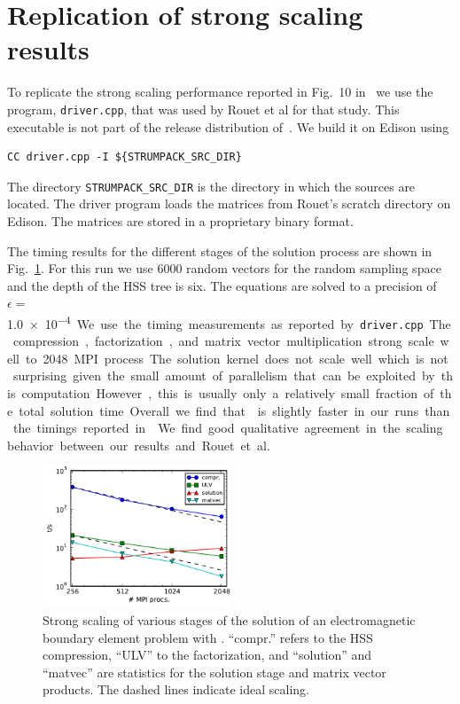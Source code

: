 \documentclass{acmsmall}
\begin{document}
\section{Replication of strong scaling results}

To replicate the strong scaling performance reported in Fig.~10
in~\cite{rouet:strumpack} we use the program, \verb!driver.cpp!,
that was used by Rouet et al for that study.  This executable is
not part of the release distribution of~\cite{rouet:strumpack}.
We build it on Edison using
\begin{verbatim}
CC driver.cpp -I ${STRUMPACK_SRC_DIR}
\end{verbatim}
The directory \verb!STRUMPACK_SRC_DIR! is the directory in which
the \strumpack{} sources are located.  The driver program loads
the matrices from Rouet's scratch directory on Edison.  The
matrices are stored in a proprietary binary format.

The timing results for the different stages of the solution
process are shown in Fig.~\ref{fig:strongscaling}.  For this run
we use 6000 random vectors for the random sampling space and the
depth of the HSS tree is six.  The equations are solved to a
precision of $\epsilon=$\SI{1.0e-4}.  We use the timing
measurements as reported by \verb~driver.cpp~.  The compression,
factorization, and matrix vector multiplication strong scale well
to 2048 MPI process.  The solution kernel does not scale well
which is not surprising given the small amount of parallelism
that can be exploited by this computation.  However, this is
usually only a relatively small fraction of the total solution
time.  Overall we find that \strumpack is slightly faster in our
runs than the timings reported in~\cite{rouet:strumpack}.  We
find good qualitative agreement in the scaling behavior between
our results and Rouet et al.
\begin{figure}
  \begin{center}
  \includegraphics[width=0.5\textwidth]{strong_scaling}
  \end{center}
  \caption{Strong scaling of various stages of the solution of an
  electromagnetic boundary element problem with \strumpack{}.
  ``compr.'' refers to the HSS compression, ``ULV'' to the
  factorization,  and ``solution'' and ``matvec'' are statistics
  for the solution stage and matrix vector products.  The dashed
  lines indicate ideal scaling.}
  \label{fig:strongscaling}
\end{figure}
\end{document}
